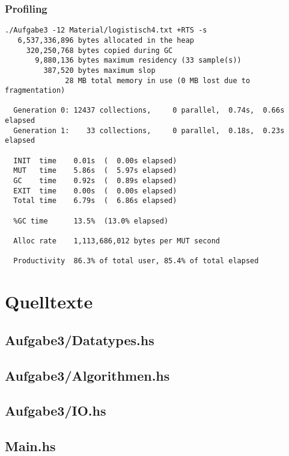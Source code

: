 \documentclass{scrreprt}
\begin{document}
\subsection*{Profiling}

\begin{verbatim}
./Aufgabe3 -12 Material/logistisch4.txt +RTS -s 
   6,537,336,896 bytes allocated in the heap
     320,250,768 bytes copied during GC
       9,880,136 bytes maximum residency (33 sample(s))
         387,520 bytes maximum slop
              28 MB total memory in use (0 MB lost due to fragmentation)

  Generation 0: 12437 collections,     0 parallel,  0.74s,  0.66s elapsed
  Generation 1:    33 collections,     0 parallel,  0.18s,  0.23s elapsed

  INIT  time    0.01s  (  0.00s elapsed)
  MUT   time    5.86s  (  5.97s elapsed)
  GC    time    0.92s  (  0.89s elapsed)
  EXIT  time    0.00s  (  0.00s elapsed)
  Total time    6.79s  (  6.86s elapsed)

  %GC time      13.5%  (13.0% elapsed)

  Alloc rate    1,113,686,012 bytes per MUT second

  Productivity  86.3% of total user, 85.4% of total elapsed
\end{verbatim}

\chapter{Quelltexte}

\section{Aufgabe3/Datatypes.hs}


\section{Aufgabe3/Algorithmen.hs}


\section{Aufgabe3/IO.hs}


\section{Main.hs}

\end{document}
